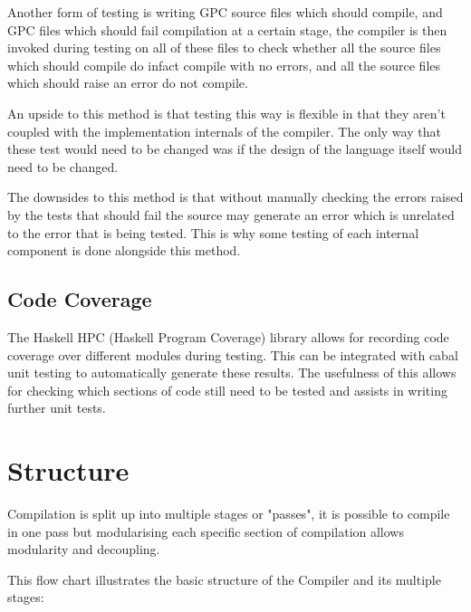 Another form of testing is writing GPC source files which should compile, and
GPC files which should fail compilation at a certain stage, the compiler
is then invoked during testing on all of these files to check whether
all the source files which should compile do infact compile with no errors,
and all the source files which should raise an error do not compile.

An upside to this method is that testing this way is flexible in that
they aren't coupled with the implementation internals of the compiler.
The only way that these test would need to be changed was if the design
of the language itself would need to be changed.

The downsides to this method is that without manually checking the errors raised
by the tests that should fail the source may generate an error which is unrelated
to the error that is being tested. This is why some testing of each internal
component is done alongside this method.

\subsection{Code Coverage}

The Haskell HPC (Haskell Program Coverage) library allows for recording
code coverage over different modules during testing. This can be integrated with
cabal unit testing to automatically generate these results. The usefulness of this
allows for checking which sections of code still need to be tested and assists
in writing further unit tests.


\section{Structure}
Compilation is split up into multiple stages or "passes",
it is possible to compile in one pass but modularising each 
specific section of compilation allows modularity and decoupling.

This flow chart illustrates the basic structure of the Compiler
and its multiple stages:


